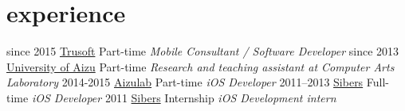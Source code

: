\documentclass[]{friggeri-cv}
\begin{document}
\section{experience}

\begin{entrylist}
  \entry
    {since 2015}
    {\href{http://www.trusoft.com/}{Trusoft}}
    {Part-time}
    {\emph{Mobile Consultant / Software Developer}}
  \entry
    {since 2013}
    {\href{www.u-aizu.ac.jp/}{University of Aizu}}
    {Part-time}
    {\emph{Research and teaching assistant at Computer Arts Laboratory}}
  \entry
    {2014-2015}
    {\href{http://www.aizulab.com/}{Aizulab}}
    {Part-time}
    {\emph{iOS Developer}}
  \entry
    {2011–2013}
    {\href{http://www.sibers.com/}{Sibers}}
    {Full-time}
    {\emph{iOS Developer}}
  \entry
    {2011}
    {\href{http://www.sibers.com/}{Sibers}}
    {Internship}
    {\emph{iOS Development intern}}
\end{entrylist}
\end{document}

